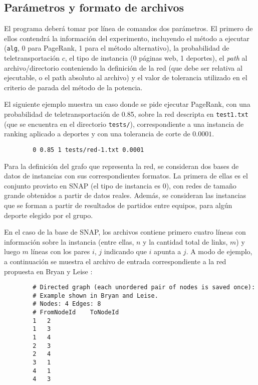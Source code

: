     \subsection*{Par\'ametros y formato de archivos}

        El programa deber\'a tomar por l\'inea de comandos dos par\'ametros. El primero de ellos contendr\'a la informaci\'on del experimento, incluyendo el m\'etodo a ejecutar (\verb+alg+, 0 para PageRank, 1 para el m\'etodo alternativo), la probabilidad de teletransportaci\'on $c$, el tipo de instancia (0 p\'aginas web, 1 deportes), el \emph{path} al archivo/directorio conteniendo la definici\'on de la red (que debe ser relativa al ejecutable, o el path absoluto al archivo) y el valor de tolerancia utilizado en el criterio de parada del m\'etodo de la potencia. 

        El siguiente ejemplo muestra un caso donde se pide ejecutar PageRank, con una probabilidad de teletransportaci\'on de 0.85, sobre la red descripta en \verb+test1.txt+ (que se encuentra en el directorio \verb+tests/+), correspondiente a una instancia de ranking aplicado a deportes y con una tolerancia de corte de $0.0001$.
        \begin{verbatim}
        0 0.85 1 tests/red-1.txt 0.0001
        \end{verbatim}

        Para la definici\'on del grafo que representa la red, se consideran dos bases de datos de instancias con sus correspondientes formatos. La primera de ellas es el conjunto provisto en SNAP \cite{SNAP} (el tipo de instancia es 0), con redes de tama\~no grande obtenidos a partir de datos reales. Adem\'as, se consideran las instancias que se forman a partir de resultados de partidos entre equipos, para alg\'un deporte elegido por el grupo. 

        En el caso de la base de SNAP, los archivos contiene primero cuatro l\'ineas con informaci\'on sobre la instancia (entre ellas, $n$ y la cantidad total de links, $m$) y luego $m$ l\'ineas con los pares $i$, $j$ indicando que $i$ apunta a $j$. A modo de ejemplo, a continuaci\'on se muestra el archivo de entrada correspondiente a la red propuesta en Bryan y Leise \cite[Figura 1]{Bryan2006}: 

        \begin{verbatim}
        # Directed graph (each unordered pair of nodes is saved once): 
        # Example shown in Bryan and Leise.
        # Nodes: 4 Edges: 8 
        # FromNodeId    ToNodeId
        1   2
        1   3
        1   4
        2   3
        2   4
        3   1
        4   1
        4   3
        \end{verbatim}

